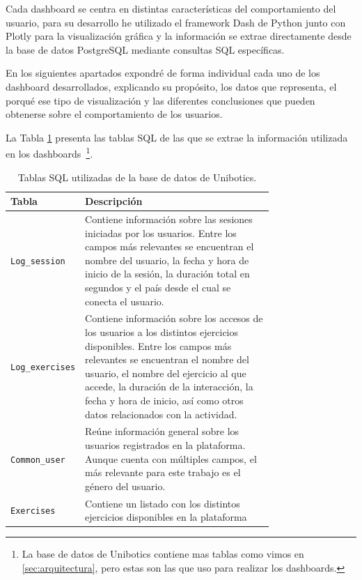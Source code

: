 \documentclass[a4paper, 12pt]{book}
\begin{document}
Cada dashboard se centra en distintas características del comportamiento del usuario, para su desarrollo he utilizado el framework Dash de Python junto con Plotly para la visualización gráfica y la información se extrae directamente desde la base de datos PostgreSQL mediante consultas SQL específicas.

En los siguientes apartados expondré de forma individual cada uno de los dashboard desarrollados, explicando su propósito, los datos que representa, el porqué ese tipo de visualización y las diferentes conclusiones que pueden obtenerse sobre el comportamiento de los usuarios.

La Tabla \ref{tbl:sql-tables} presenta las tablas SQL de las que se extrae la información utilizada en los dashboards~\footnote{La base de datos de Unibotics contiene mas tablas como vimos en \ref{sec:arquitectura}, pero estas son las que uso para realizar los dashboards.}.

\begin{table}[!htb]
\centering
\caption{Tablas SQL utilizadas de la base de datos de Unibotics.}
\label{tbl:sql-tables}
\begin{tabular}{lp{0.75\linewidth}}
\toprule
\textbf{Tabla} & \textbf{Descripción} \\
\midrule
\texttt{Log\_session} & Contiene información sobre las sesiones iniciadas por los usuarios. Entre los campos más relevantes se encuentran el nombre del usuario, la fecha y hora de inicio de la sesión, la duración total en segundos y el país desde el cual se conecta el usuario. \\
\texttt{Log\_exercises} & Contiene información sobre los accesos de los usuarios a los distintos ejercicios disponibles. Entre los campos más relevantes se encuentran el nombre del usuario, el nombre del ejercicio al que accede, la duración de la interacción, la fecha y hora de inicio, así como otros datos relacionados con la actividad. \\
\texttt{Common\_user} & Reúne información general sobre los usuarios registrados en la plataforma. Aunque cuenta con múltiples campos, el más relevante para este trabajo es el género del usuario. \\
\texttt{Exercises} & Contiene un listado con los distintos ejercicios disponibles en la plataforma \\
\bottomrule
\end{tabular}
\vspace{1ex}

\end{table}
\end{document}
